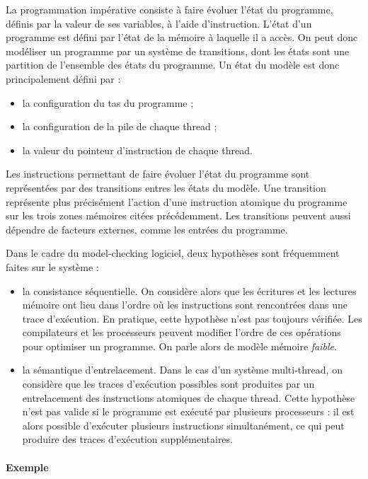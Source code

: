 La programmation impérative consiste à faire évoluer l'état du programme,
définis par la valeur de ses variables, à l'aide d'instruction. L'état d'un
programme est défini par l'état de la mémoire à laquelle il a accès. On peut
donc modéliser un programme par un système de transitions, dont les états sont
une partition de l'ensemble des états du programme.
Un état du modèle est donc principalement défini par :

\begin{itemize}
\item
  la configuration du tas du programme ;
\item
  la configuration de la pile de chaque thread ;
\item
  la valeur du pointeur d'instruction de chaque thread.
\end{itemize}

Les instructions permettant de faire évoluer l'état du programme sont
représentées par des transitions entres les états du modèle. Une transition
représente plus précisément l'action d'une instruction atomique du programme sur
les trois zones mémoires citées précédemment. Les transitions peuvent aussi
dépendre de facteurs externes, comme les entrées du programme.

Dans le cadre du model-checking logiciel, deux hypothèses sont fréquemment
faites sur le système :

\begin{itemize}
\item
  la consistance séquentielle. On considère alors que les écritures et
  les lectures mémoire ont lieu dans l'ordre où les instructions sont
  rencontrées dans une trace d'exécution. En pratique, cette hypothèse
  n'est pas toujours vérifiée. Les compilateurs et les processeurs
  peuvent modifier l'ordre de ces opérations pour optimiser un
  programme. On parle alors de modèle mémoire \emph{faible}.
\item
  la sémantique d'entrelacement. Dans le cas d'un système multi-thread,
  on considère que les traces d'exécution possibles sont produites par
  un entrelacement des instructions atomiques de chaque thread. Cette
  hypothèse n'est pas valide si le programme est exécuté par plusieurs
  processeurs : il est alors possible d'exécuter plusieurs instructions
  simultanément, ce qui peut produire des traces d'exécution
  supplémentaires.
\end{itemize}

\paragraph{Exemple}

